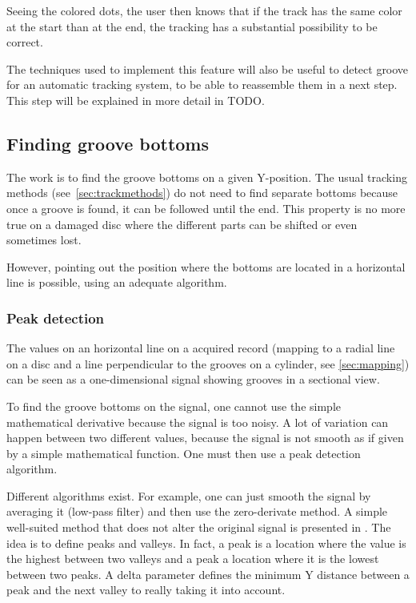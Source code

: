 Seeing the colored dots, the user then knows that if the track has the same color at the start than at the end, the tracking has a substantial possibility to be correct.

The techniques used to implement this feature will also be useful to detect groove for an automatic tracking system, to be able to reassemble them in a next step. This step will be explained in more detail in TODO. %

\subsection{Finding groove bottoms}

The work is to find the groove bottoms on a given Y-position. The usual tracking methods (see~\autoref{sec:trackmethods}) do not need to find separate bottoms because once a groove is found, it can be followed until the end. This property is no more true on a damaged disc where the different parts can be shifted or even sometimes lost.

However, pointing out the position where the bottoms are located in a horizontal line is possible, using an adequate algorithm.

\subsubsection{Peak detection}
\label{sec:peakdetect}

The values on an horizontal line on a acquired record (mapping to a radial line on a disc and a line perpendicular to the grooves on a cylinder, see \autoref{sec:mapping}) can be seen as a one-dimensional signal showing grooves in a sectional view.

To find the groove bottoms on the signal, one cannot use the simple mathematical derivative because the signal is too noisy. A lot of variation can happen between two different values, because the signal is not smooth as if given by a simple mathematical function. One must then use a peak detection algorithm.

Different algorithms exist. For example, one can just smooth the signal by averaging it (low-pass filter) and then use the zero-derivate method. A simple well-suited method that does not alter the original signal is presented in \cite{peak12}. The idea is to define peaks and valleys. In fact, a peak is a location where the value is the highest between two valleys and a peak a location where it is the lowest between two peaks. A delta parameter defines the minimum Y distance between a peak and the next valley to really taking it into account.

